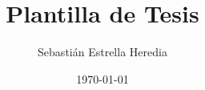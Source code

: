 \documentclass[12pt,oneside,a4paper]{book}
\begin{document}
\title{Plantilla de Tesis}
\author{Sebastián Estrella Heredia}
\date{\today}



\frontmatter






\tableofcontents
\listoftables
\listoffigures

\mainmatter








\end{document}

